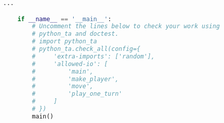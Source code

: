 \documentclass[12pt]{article}
\begin{document}
\begin{lstlisting}[language=Python]
    ...

    if __name__ == '__main__':
        # Uncomment the lines below to check your work using
        # python_ta and doctest.
        # import python_ta
        # python_ta.check_all(config={
        #     'extra-imports': ['random'],
        #     'allowed-io': [
        #         'main',
        #         'make_player',
        #         'move',
        #         'play_one_turn'
        #     ]
        # })
        main()
\end{lstlisting}
\end{document}
